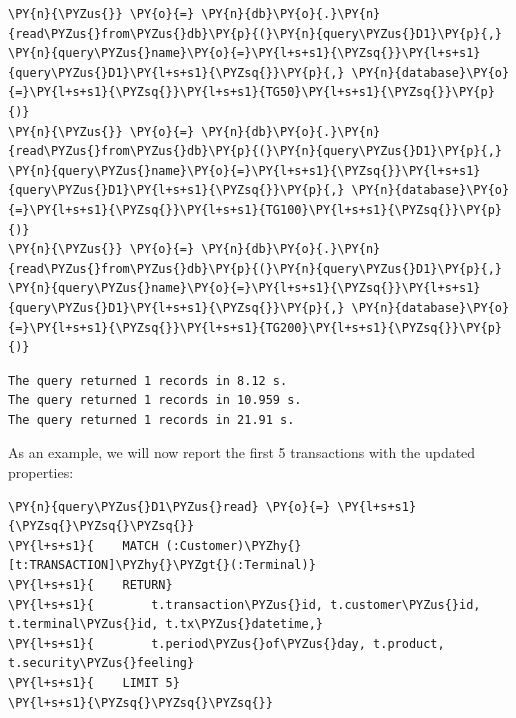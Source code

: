     \begin{tcolorbox}[breakable, size=fbox, boxrule=1pt, pad at break*=1mm,colback=cellbackground, colframe=cellborder]
\begin{Verbatim}[commandchars=\\\{\}]
\PY{n}{\PYZus{}} \PY{o}{=} \PY{n}{db}\PY{o}{.}\PY{n}{read\PYZus{}from\PYZus{}db}\PY{p}{(}\PY{n}{query\PYZus{}D1}\PY{p}{,} \PY{n}{query\PYZus{}name}\PY{o}{=}\PY{l+s+s1}{\PYZsq{}}\PY{l+s+s1}{query\PYZus{}D1}\PY{l+s+s1}{\PYZsq{}}\PY{p}{,} \PY{n}{database}\PY{o}{=}\PY{l+s+s1}{\PYZsq{}}\PY{l+s+s1}{TG50}\PY{l+s+s1}{\PYZsq{}}\PY{p}{)}
\PY{n}{\PYZus{}} \PY{o}{=} \PY{n}{db}\PY{o}{.}\PY{n}{read\PYZus{}from\PYZus{}db}\PY{p}{(}\PY{n}{query\PYZus{}D1}\PY{p}{,} \PY{n}{query\PYZus{}name}\PY{o}{=}\PY{l+s+s1}{\PYZsq{}}\PY{l+s+s1}{query\PYZus{}D1}\PY{l+s+s1}{\PYZsq{}}\PY{p}{,} \PY{n}{database}\PY{o}{=}\PY{l+s+s1}{\PYZsq{}}\PY{l+s+s1}{TG100}\PY{l+s+s1}{\PYZsq{}}\PY{p}{)}
\PY{n}{\PYZus{}} \PY{o}{=} \PY{n}{db}\PY{o}{.}\PY{n}{read\PYZus{}from\PYZus{}db}\PY{p}{(}\PY{n}{query\PYZus{}D1}\PY{p}{,} \PY{n}{query\PYZus{}name}\PY{o}{=}\PY{l+s+s1}{\PYZsq{}}\PY{l+s+s1}{query\PYZus{}D1}\PY{l+s+s1}{\PYZsq{}}\PY{p}{,} \PY{n}{database}\PY{o}{=}\PY{l+s+s1}{\PYZsq{}}\PY{l+s+s1}{TG200}\PY{l+s+s1}{\PYZsq{}}\PY{p}{)}
\end{Verbatim}
\end{tcolorbox}

    \begin{Verbatim}[commandchars=\\\{\}]
The query returned 1 records in 8.12 s.
The query returned 1 records in 10.959 s.
The query returned 1 records in 21.91 s.
    \end{Verbatim}

    As an example, we will now report the first 5 transactions with the
updated properties:

    \begin{tcolorbox}[breakable, size=fbox, boxrule=1pt, pad at break*=1mm,colback=cellbackground, colframe=cellborder]
\begin{Verbatim}[commandchars=\\\{\}]
\PY{n}{query\PYZus{}D1\PYZus{}read} \PY{o}{=} \PY{l+s+s1}{\PYZsq{}\PYZsq{}\PYZsq{}}
\PY{l+s+s1}{    MATCH (:Customer)\PYZhy{}[t:TRANSACTION]\PYZhy{}\PYZgt{}(:Terminal)}
\PY{l+s+s1}{    RETURN}
\PY{l+s+s1}{        t.transaction\PYZus{}id, t.customer\PYZus{}id, t.terminal\PYZus{}id, t.tx\PYZus{}datetime,}
\PY{l+s+s1}{        t.period\PYZus{}of\PYZus{}day, t.product, t.security\PYZus{}feeling}
\PY{l+s+s1}{    LIMIT 5}
\PY{l+s+s1}{\PYZsq{}\PYZsq{}\PYZsq{}}
\end{Verbatim}
\end{tcolorbox}

